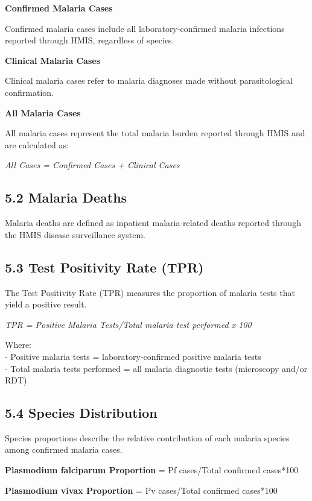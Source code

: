 \documentclass[
  letterpaper,
  DIV=11,
  numbers=noendperiod]{scrartcl}
\begin{document}
\textbf{Confirmed Malaria Cases}

Confirmed malaria cases include all laboratory-confirmed malaria
infections reported through HMIS, regardless of species.

\textbf{Clinical Malaria Cases}

Clinical malaria cases refer to malaria diagnoses made without
parasitological confirmation.

\textbf{All Malaria Cases}

All malaria cases represent the total malaria burden reported through
HMIS and are calculated as:

\emph{All Cases = Confirmed Cases + Clinical Cases}

\subsection{5.2 Malaria Deaths}\label{malaria-deaths}

Malaria deaths are defined as inpatient malaria-related deaths reported
through the HMIS disease surveillance system.

\subsection{5.3 Test Positivity Rate
(TPR)}\label{test-positivity-rate-tpr}

The Test Positivity Rate (TPR) measures the proportion of malaria tests
that yield a positive result.

\emph{TPR = Positive Malaria Tests/Total malaria test performed x 100}

Where:\\
- Positive malaria tests = laboratory-confirmed positive malaria tests\\
- Total malaria tests performed = all malaria diagnostic tests
(microscopy and/or RDT)

\subsection{5.4 Species Distribution}\label{species-distribution}

Species proportions describe the relative contribution of each malaria
species among confirmed malaria cases.

\textbf{Plasmodium falciparum Proportion} = Pf cases/Total confirmed
cases*100

\textbf{Plasmodium vivax Proportion} = Pv cases/Total confirmed
cases*100
\end{document}
